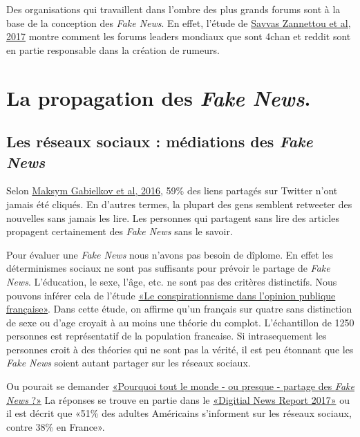 \documentclass[11pt,a4paper,oldfontcommands]{memoir}
\begin{document}
Des organisations qui travaillent dans l'ombre des plus grands forums sont à la base de la conception des \textit{Fake News}.
En effet, l'étude de \href{https://arxiv.org/abs/1705.06947}{Savvas Zannettou et al, 2017} montre comment les forums leaders mondiaux que sont 4chan et reddit sont en partie responsable dans la création de rumeurs.


\section{La propagation des \textit{Fake News}.}


\subsection{Les réseaux sociaux : médiations des \textit{Fake News}}
Selon \href{https://hal.inria.fr/hal-01281190}{Maksym Gabielkov et al, 2016}, 59\% des liens partagés sur Twitter n'ont jamais été cliqués.
En d'autres termes, la plupart des gens semblent retweeter des nouvelles sans jamais les lire.
Les personnes qui partagent sans lire des articles propagent certainement des \textit{Fake News} sans le savoir.

Pour évaluer une \textit{Fake News} nous n'avons pas besoin de dîplome.
En effet les déterminismes sociaux ne sont pas suffisants pour prévoir le partage de \textit{Fake News}.
L'éducation, le sexe, l'âge, etc. ne sont pas des critères distinctifs.
Nous pouvons inférer cela de l'étude \href{https://jean-jaures.org/nos-productions/le-conspirationnisme-dans-l-opinion-publique-francaise}{«Le conspirationnisme dans l’opinion publique française»}. Dans cette étude, on affirme qu'un français sur quatre sans distinction de sexe ou d'age croyait à au moins une théorie du complot. L'échantillon de 1250 personnes est représentatif de la population francaise. Si intrasequement les personnes croit à des théories qui ne sont pas la vérité, il est peu étonnant que les \textit{Fake News} soient autant partager sur les réseaux sociaux.

Ou pourait se demander
\href{http://esj-pro.fr/pourquoi-tout-le-monde%E2%80%8A-%E2%80%8Aou-presque%E2%80%8A-%E2%80%8Apartage-des-fake-news/}{
 «Pourquoi tout le monde - ou presque - partage des \textit{Fake News} ?»} La réponses se trouve en partie dans le
\href{http://www.digitalnewsreport.org/}{«Digitial News Report 2017»}
ou il est décrit que «51\% des adultes Américains s’informent sur les réseaux sociaux, contre 38\% en France».
\end{document}
